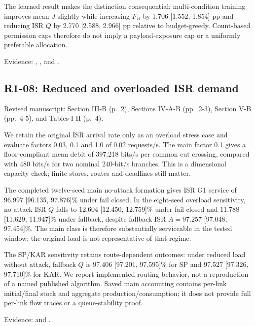 The learned result makes the distinction consequential: multi-condition training improves mean \(J\) slightly while increasing \(F_B\) by 1.706 {[}1.552, 1.854{]} pp and reducing ISR \(Q\) by 2.770 {[}2.588, 2.966{]} pp relative to budget-greedy. Count-based permission caps therefore do not imply a payload-exposure cap or a uniformly preferable allocation.

Evidence: , , and .

\subsection{R1-08: Reduced and overloaded ISR demand}\label{r1-08-reduced-and-overloaded-isr-demand}

Revised manuscript: Section III-B (p.~2), Sections IV-A-B (pp.~2-3), Section V-B (pp.~4-5), and Tables I-II (p.~4).

We retain the original ISR arrival rate only as an overload stress case and evaluate factors 0.03, 0.1 and 1.0 of 0.02 requests/s. The main factor 0.1 gives a floor-compliant mean debit of 397.218 bits/s per common cut crossing, compared with 480 bits/s for two nominal 240-bit/s branches. This is a dimensional capacity check; finite stores, routes and deadlines still matter.

The completed twelve-seed main no-attack formation gives ISR G1 service of 96.997 {[}96.135, 97.876{]}\% under fail closed. In the eight-seed overload sensitivity, no-attack ISR \(Q\) falls to 12.604 {[}12.450, 12.759{]}\% under fail closed and 11.788 {[}11.629, 11.947{]}\% under fallback, despite fallback ISR \(A=97.257\) {[}97.048, 97.454{]}\%. The main class is therefore substantially serviceable in the tested window; the original load is not representative of that regime.

The SP/KAR sensitivity retains route-dependent outcomes: under reduced load without attack, fallback \(Q\) is 97.406 {[}97.201, 97.595{]}\% for SP and 97.527 {[}97.326, 97.710{]}\% for KAR. We report implemented routing behavior, not a reproduction of a named published algorithm. Saved main accounting contains per-link initial/final stock and aggregate production/consumption; it does not provide full per-link flow traces or a queue-stability proof.

Evidence:  and .

